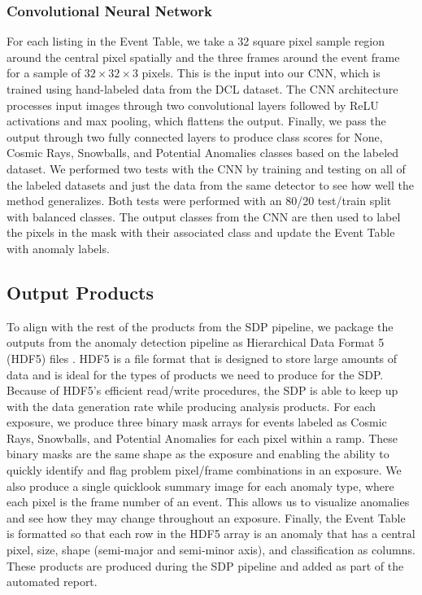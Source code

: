 \subsubsection{Convolutional Neural Network}
\label{rst/sec:CNN}
For each listing in the Event Table, we take a 32 square pixel sample region around the central pixel spatially and the three frames around the event frame for a sample of $32 \times 32  \times 3$ pixels. 
This is the input into our CNN, which is trained using hand-labeled data from the DCL dataset. 
The CNN architecture processes input images through two convolutional layers followed by ReLU activations and max pooling, which flattens the output.
Finally, we pass the output through two fully connected layers to produce class scores for None, Cosmic Rays, Snowballs, and Potential Anomalies classes based on the labeled dataset.
We performed two tests with the CNN by training and testing on all of the labeled datasets and just the data from the same detector to see how well the method generalizes. 
Both tests were performed with an 80/20 test/train split with balanced classes. 
The output classes from the CNN are then used to label the pixels in the mask with their associated class and update the Event Table with anomaly labels. 
\subsection{Output Products}
To align with the rest of the products from the SDP pipeline, we package the outputs from the anomaly detection pipeline as Hierarchical Data Format 5 (HDF5) files \parencite{The_HDF_Group_Hierarchical_Data_Format}.
HDF5 is a file format that is designed to store large amounts of data and is ideal for the types of products we need to produce for the SDP.
Because of HDF5's efficient read/write procedures, the SDP is able to keep up with the data generation rate while producing analysis products. 
For each exposure, we produce three binary mask arrays for events labeled as Cosmic Rays, Snowballs, and Potential Anomalies for each pixel within a ramp. 
These binary masks are the same shape as the exposure and enabling the ability to quickly identify and flag problem pixel/frame combinations in an exposure. 
We also produce a single quicklook summary image for each anomaly type, where each pixel is the frame number of an event. 
This allows us to visualize anomalies and see how they may change throughout an exposure.
Finally, the Event Table is formatted so that each row in the HDF5 array is an anomaly that has a central pixel, size, shape (semi-major and semi-minor axis), and classification as columns. 
These products are produced during the SDP pipeline and added as part of the automated report. 

